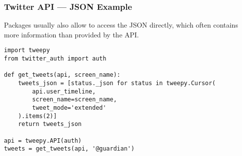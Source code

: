 \begin{frame}[fragile]
    \frametitle{Twitter API --- JSON Example}

    Packages usually also allow to access the JSON directly, which
    often contains more information than provided by the API.

    \begin{verbatim}
import tweepy
from twitter_auth import auth

def get_tweets(api, screen_name):
    tweets_json = [status._json for status in tweepy.Cursor(
        api.user_timeline,
        screen_name=screen_name,
        tweet_mode='extended'
    ).items(2)]
    return tweets_json

api = tweepy.API(auth)
tweets = get_tweets(api, '@guardian')
    \end{verbatim}
\end{frame}

